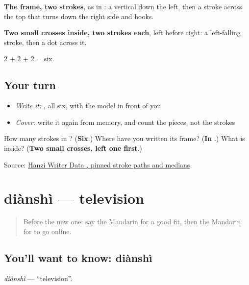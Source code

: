 \begin{quote}
\end{quote}

\textbf{The frame, two strokes}, as in : a vertical down the left, then a stroke across the top that turns down the right side and hooks.

\textbf{Two small crosses inside, two strokes each}, left before right: a left-falling stroke, then a dot across it.

2 + 2 + 2 = six.

\subsection*{Your turn}
\begin{itemize}
\raggedright
  \item \emph{Write it:} , all six, with the model in front of you
  \item \emph{Cover:} write it again from memory, and count the pieces, not the strokes
\end{itemize}

\begin{tcolorbox}[breakable,colback=teal!4,colframe=teal!35!black,title={Before you move on}]
How many strokes in ? (\textbf{Six}.) Where have you written its frame? (\textbf{In }.) What is inside? (\textbf{Two small crosses, left one first}.)

Source: \href{https://raw.githubusercontent.com/chanind/hanzi-writer-data/68d10a4b21150cae5e1ebbd223eed289cf32d90c/data/\%E7\%BD\%91.json}{Hanzi Writer Data , pinned stroke paths and medians}.
\end{tcolorbox}
\section[diànshì]{diànshì — television}

\label{lesson:ZH-C109-dianshi}



\begin{quote}
Before the new one: say the Mandarin for a good fit, then the Mandarin for to go online.
\end{quote}

\subsection*{You'll want to know: diànshì}
\emph{diànshì} — \textquotedblleft{}television\textquotedblright{}.

